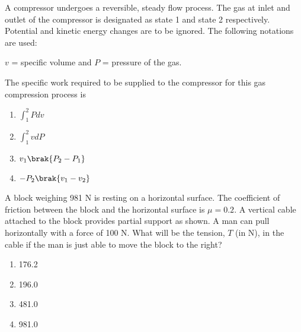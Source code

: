 \item A compressor undergoes a reversible, steady flow process. The gas
at inlet and outlet of the compressor is designated as state 1 and state
2 respectively. Potential and kinetic energy changes are to be ignored.
The following notations are used:

$v$ = specific volume and $P$ = pressure of the gas.

The specific work required to be supplied to the compressor for this gas
compression process is 
\begin{multicols}{4}
\begin{enumerate}
\item $\int_{1}^{2} Pdv$
\item $\int_{1}^{2} vdP$
\item $v_1\brak{P_2 - P_1}$
\item $-P_2\brak{v_1 - v_2}$
\end{enumerate}
\end{multicols}

\item A block weighing 981 N is resting on a horizontal surface. The coefficient
of friction between the block and the horizontal surface is $\mu = 0.2$. A vertical
cable attached to the block provides partial support as shown. A man can pull
horizontally with a force of 100 N. What will be the tension, $T$ (in N), in the
cable if the man is just able to move the block to the right?

\begin{center}
\end{center}

\begin{multicols}{4}
\begin{enumerate}
    \item 176.2
    \item 196.0
    \item 481.0
    \item 981.0
\end{enumerate}
\end{multicols}

